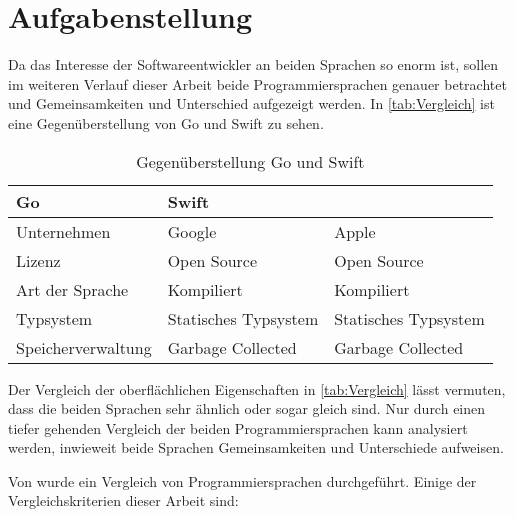 \section{Aufgabenstellung}
Da das Interesse der Softwareentwickler an beiden Sprachen so enorm ist, sollen im weiteren Verlauf dieser Arbeit beide Programmiersprachen genauer betrachtet und Gemeinsamkeiten und Unterschied aufgezeigt werden.
In \autoref{tab:Vergleich} ist eine Gegenüberstellung von Go und Swift zu sehen.

\begin{table}[H]
    \centering
    \begin{tabularx}{\textwidth}{|X|X|X|}
    \hline 
    \rowcolor[gray]{0.75} \textbf{Go} & \textbf{Swift} \\
    \hline
	Unternehmen & Google & Apple \\
	\hline
	Lizenz & Open Source & Open Source \\
	\hline
	Art der Sprache & Kompiliert & Kompiliert \\
	\hline  
	Typsystem & Statisches Typsystem & Statisches Typsystem \\
	\hline
	Speicherverwaltung & Garbage Collected & Garbage Collected \\
    \hline
    \end{tabularx}
    \caption{Gegenüberstellung Go und Swift}
    \label{tab:Vergleich}
\end{table}


Der Vergleich der oberflächlichen Eigenschaften in \autoref{tab:Vergleich} lässt vermuten, dass die beiden Sprachen sehr ähnlich oder sogar gleich sind.
Nur durch einen tiefer gehenden Vergleich der beiden Programmiersprachen kann analysiert werden, inwieweit beide Sprachen Gemeinsamkeiten und Unterschiede aufweisen.

Von \cite{Comparsion} wurde ein Vergleich von Programmiersprachen durchgeführt.
Einige der Vergleichskriterien dieser Arbeit sind:

